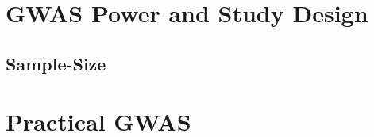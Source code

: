\documentclass{pset}
\begin{document}
\subsection{}

\subsection{}

\subsection{}


\section{GWAS Power and Study Design}

\subsection{}

\subsection{Sample-Size}



\subsection{\bLozenge\bLozenge\bLozenge}

\section{Practical GWAS}

\subsection{}

\subsection{}

\subsection{}
\end{document}
